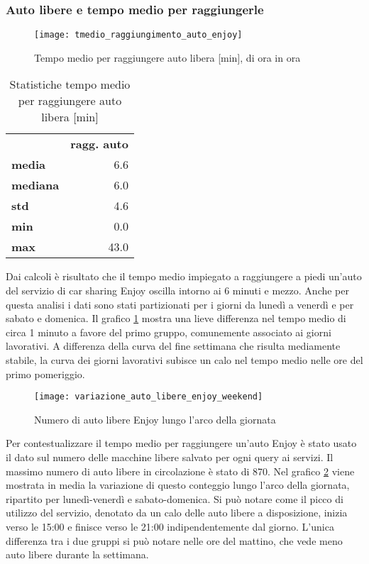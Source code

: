 \subsubsection{Auto libere e tempo medio per raggiungerle}

\begin{figure}[H]
	\texttt{[image: tmedio\_raggiungimento\_auto\_enjoy]}
	\caption{Tempo medio per raggiungere auto libera [min], di ora in ora}
	\label{image:5}
\end{figure}

\begin{table}[H]
	\centering
	\begin{tabular}{ | l r | }
		\hline
		& \textbf{ragg. auto} \\
		\textbf{media}   &  6.6 \\
		\textbf{mediana} &  6.0 \\
		\textbf{std}     &  4.6 \\
		\textbf{min}     &  0.0 \\ 
		\textbf{max}     & 43.0 \\
		\hline
	\end{tabular}
	\caption{Statistiche tempo medio per raggiungere auto libera [min]}
	\label{table:4}
\end{table}

Dai calcoli è risultato che il tempo medio impiegato a raggiungere a piedi un'auto del servizio di car sharing Enjoy oscilla intorno ai 6 minuti e mezzo. Anche per questa analisi i dati sono stati partizionati per i giorni da lunedì a venerdì e per sabato e domenica. Il grafico \ref{image:5} mostra una lieve differenza nel tempo medio di circa 1 minuto a favore del primo gruppo, comunemente associato ai giorni lavorativi. A differenza della curva del fine settimana che risulta mediamente stabile, la curva dei giorni lavorativi subisce un calo nel tempo medio nelle ore del primo pomeriggio.

\begin{figure}[H]
	\texttt{[image: variazione\_auto\_libere\_enjoy\_weekend]}
	\caption{Numero di auto libere Enjoy lungo l'arco della giornata}
	\label{image:6}
\end{figure}

Per contestualizzare il tempo medio per raggiungere un'auto Enjoy è stato usato il dato sul numero delle macchine libere salvato per ogni query ai servizi. Il massimo numero di auto libere in circolazione è stato di 870. Nel grafico \ref{image:6} viene mostrata in media la variazione di questo conteggio lungo l'arco della giornata, ripartito per lunedì-venerdì e sabato-domenica. Si può notare come il picco di utilizzo del servizio, denotato da un calo delle auto libere a disposizione, inizia verso le 15:00 e finisce verso le 21:00 indipendentemente dal giorno. L'unica differenza tra i due gruppi si può notare nelle ore del mattino, che vede meno auto libere durante la settimana.

